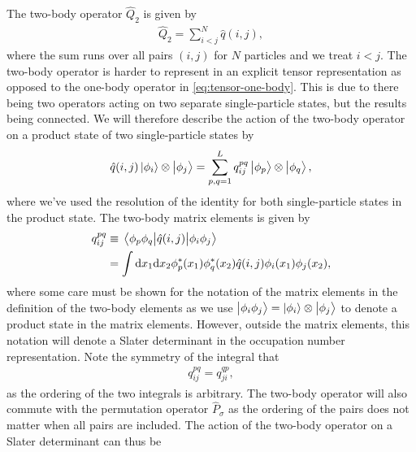         The two-body operator $\hat{Q}_2$ is given by
        \begin{align}
            \hat{Q}_2
            = \sum_{i < j}^{N}
            \hat{q}(i, j),
        \end{align}
        where the sum runs over all pairs $(i, j)$ for $N$ particles and we
        treat $i < j$.
        The two-body operator is harder to represent in an explicit tensor
        representation as opposed to the one-body operator in
        \autoref{eq:tensor-one-body}.
        This is due to there being two operators acting on two separate
        single-particle states, but the results being connected.
        We will therefore describe the action of the two-body operator on a
        product state of two single-particle states by
        \begin{align}
            \hat{q}(i, j)\ket{\phi_i}\otimes\ket{\phi_j}
            = \sum_{p, q = 1}^{L}
            q^{pq}_{ij}
            \ket{\phi_p}\otimes\ket{\phi_q},
        \end{align}
        where we've used the resolution of the identity for both single-particle
        states in the product state.
        The two-body matrix elements is given by
        \begin{align}
            q^{pq}_{ij}
            &\equiv
            \mel{\phi_p\phi_q}{\hat{q}(i, j)}{\phi_i\phi_j}
            \\
            &=
            \int\dd x_1 \dd x_2
            \phi^{*}_{p}(x_1)\phi^{*}_{q}(x_2)
            \hat{q}(i, j)
            \phi_i(x_1)\phi_j(x_2),
        \end{align}
        where some care must be shown for the notation of the matrix elements in
        the definition of the two-body elements as we use $\ket{\phi_i\phi_j} =
        \ket{\phi_i}\otimes\ket{\phi_j}$ to denote a product state in the matrix
        elements.
        However, outside the matrix elements, this notation will denote a Slater
        determinant in the occupation number representation.
        Note the symmetry of the integral that
        \begin{align}
            q^{pq}_{ij} = q^{qp}_{ji},
            \label{eq:symmetry-two-body}
        \end{align}
        as the ordering of the two integrals is arbitrary.
        The two-body operator will also commute with the permutation operator
        $\hat{P}_{\sigma}$ as the ordering of the pairs does not matter when all
        pairs are included.
        The action of the two-body operator on a Slater determinant can thus be
